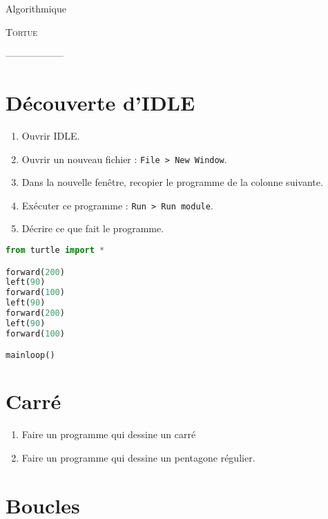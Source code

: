 \documentclass[12pt]{article}
\begin{document}
\begin{center}
  Algorithmique

  {\large
    \textsc{Tortue}
  }

  ------------------
\end{center}

\section{Découverte d'IDLE}

\begin{multicols}{2}
\begin{enumerate}
  \item Ouvrir IDLE.
  \item Ouvrir un nouveau fichier : \texttt{File > New Window}.
  \item Dans la nouvelle fenêtre, recopier le programme de la colonne suivante.
\item Exécuter ce programme : \texttt{Run > Run module}.
\item Décrire ce que fait le programme.
\end{enumerate}

\columnbreak

\begin{lstlisting}[language=python,frame=single]
from turtle import *

forward(200)
left(90)
forward(100)
left(90)
forward(200)
left(90)
forward(100)

mainloop()
\end{lstlisting}

\end{multicols}

\section{Carré}

\begin{enumerate}
  \item Faire un programme qui dessine un carré
  \item Faire un programme qui dessine un pentagone régulier.
\end{enumerate}

\section{Boucles}
\end{document}
